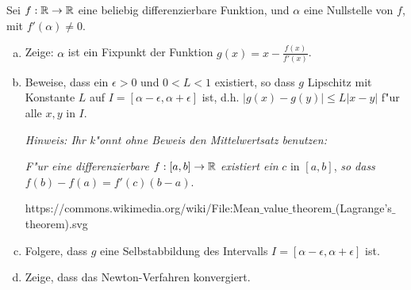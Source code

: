 \documentclass[a4paper,10pt]{article}
\begin{document}
%  
%  
% 
% 


\begin{Aufg}
 Sei $f: \mathbb{R} \to \mathbb{R}$ eine beliebig differenzierbare Funktion, und $\alpha$ eine Nullstelle von $f$,
 mit $f'(\alpha) \neq 0$.
 \begin{enumerate}[(a)]
  \item Zeige: $\alpha$ ist ein Fixpunkt der Funktion $g(x)= x - \frac{f(x)}{f'(x)}$.
  \item Beweise, dass ein $\epsilon > 0$ und $0<L<1$ existiert, so dass $g$ Lipschitz 
  mit Konstante $L$ auf 
  $I=\left[ \alpha - \epsilon , \alpha + \epsilon \right]$ ist, d.h. 
  $|g(x) - g(y)| \leq L|x-y|$ f"ur alle $x,y$ in $I$.
  
  
  \textit{
  Hinweis: Ihr k"onnt ohne Beweis den Mittelwertsatz benutzen: }
  
\textit{  F"ur eine differenzierbare}
  $f:\left[ a, b \right] \to \mathbb{R}$ \textit{existiert ein }$c$ in $\left[ a, b \right]$,
  \textit{so dass}
  $f(b) - f(a) = f'(c)(b-a)$.
  \begin{center}
 
 
 \tiny 
 https://commons.wikimedia.org/wiki/File:Mean$\_$value$\_$theorem$\_$(Lagrange's$\_$theorem).svg
\end{center}
 
  
  \item Folgere, dass $g$ eine Selbstabbildung des Intervalls
  $I=\left[ \alpha - \epsilon , \alpha + \epsilon \right]$ ist.
  \item Zeige, dass das Newton-Verfahren konvergiert.
 \end{enumerate}

\end{Aufg}
\end{document}
